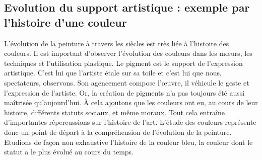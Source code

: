 \subsection{Evolution du support artistique : exemple par l'histoire d'une couleur}
\xspace
	L'évolution de la peinture à travers les siècles est très liée à l'histoire des couleurs. Il est important d'observer l'évolution des couleurs dans les m\oe{}urs, les techniques et l'utilisation plastique. Le pigment est le support de l'expression artistique. C'est lui que l'artiste étale sur sa toile et c'est lui que nous, spectateurs, observons. Son agencement compose l'\oe{}uvre, il véhicule le geste et l'expression de l'artiste. Or, la création de pigments n'a pas toujours été aussi maîtrisée qu'aujourd'hui. À cela ajoutons que les couleurs ont eu, au cours de leur histoire, différents statuts sociaux, et même moraux. Tout cela entraîne d'importantes répercussions sur l'histoire de l'art. L'étude des couleurs représente donc un point de départ à la compréhension de l'évolution de la peinture. Etudions de façon non exhaustive l'histoire de la couleur bleu, la couleur dont le statut a le plus évolué au cours du temps.

